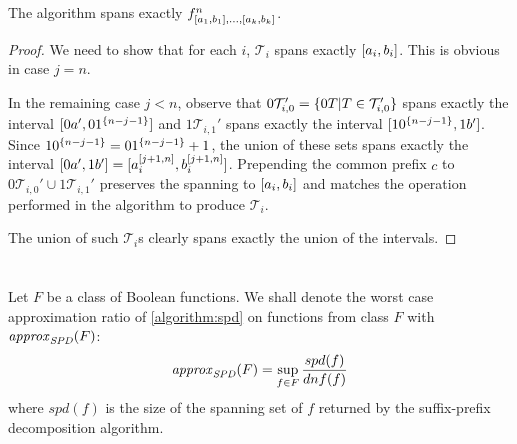 
\section{\titlefeasibility}
\begin{theorem}
The algorithm spans exactly
$f^n_{[a_1, b_1], \ldots, [a_k, b_k]}$.
\end{theorem}

\begin{proof}
We need to show that for each $i$,
$\mathcal{T}_i$ spans exactly $[a_i, b_i]$.
This is obvious in case $j = n$.

In the remaining case $j < n$,
observe that
$0 \mathcal{T}_{i, 0}'
= \{0 T | T \in \mathcal{T}_{i, 0}'\}$
spans exactly the interval
$[0 a', 0 1^{\{n-j-1\}}]$
and $1 \mathcal{T}_{i, 1}'$
spans exactly the interval
$[1 0^{\{n-j-1\}}, 1 b']$.
Since $1 0^{\{n-j-1\}} = 0 1^{\{n-j-1\}} + 1$,
the union of these sets
spans exactly the interval
$[0 a', 1 b']
= [a_i^{[j+1, n]}, b_i^{[j+1, n]}]$.
Prepending the common prefix $c$ to
$0 \mathcal{T}_{i, 0}' \cup 1 \mathcal{T}_{i, 1}'$
preserves the spanning to
$[a_i, b_i]$
and matches the operation performed in the algorithm
to produce $\mathcal{T}_i$.

The union of such $\mathcal{T}_i$s clearly spans exactly
the union of the intervals.
\end{proof}

\section{\titleapproxratio}
\label{sec:spdapproxratio}


Let $F$ be a class of Boolean functions.
We shall denote the worst case approximation ratio
of \cref{algorithm:spd}
on functions from class $F$ with $\mathit{approx}_{\mathit{SPD}} (F)$:
$$
\mathit{approx}_{\mathit{SPD}} (F)
= \sup_{f \in F}{\frac{spd(f)}{dnf(f)}}
$$
where $spd(f)$ is the size of the spanning set of $f$
returned by the suffix-prefix decomposition algorithm.


